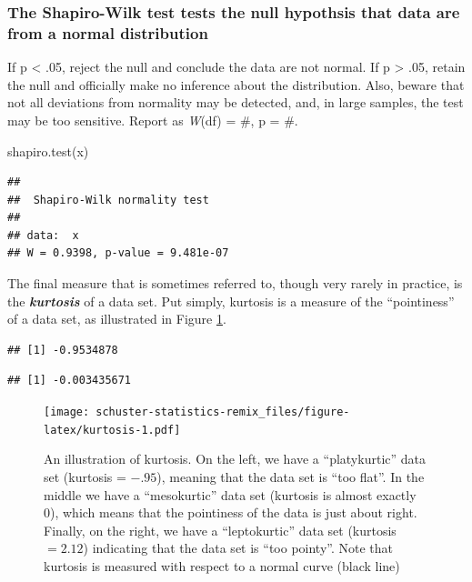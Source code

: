 \documentclass[
]{book}
\newenvironment{Shaded}{\begin{snugshade}}{\end{snugshade}}
\newcommand{\FunctionTok}[1]{\textcolor[rgb]{0.00,0.00,0.00}{#1}}
\newcommand{\NormalTok}[1]{#1}
\begin{document}
\hypertarget{the-shapiro-wilk-test-tests-the-null-hypothsis-that-data-are-from-a-normal-distribution}{%
\subsubsection{The Shapiro-Wilk test tests the null hypothsis that data are from a normal distribution}\label{the-shapiro-wilk-test-tests-the-null-hypothsis-that-data-are-from-a-normal-distribution}}

If p \textless{} .05, reject the null and conclude the data are not normal. If p \textgreater{} .05, retain the null and officially make no inference about the distribution. Also, beware that not all deviations from normality may be detected, and, in large samples, the test may be too sensitive. Report as \emph{W}(df) = \#, p = \#.

\begin{Shaded}
\begin{Highlighting}[]
\FunctionTok{shapiro.test}\NormalTok{(x) }
\end{Highlighting}
\end{Shaded}

\begin{verbatim}
## 
##  Shapiro-Wilk normality test
## 
## data:  x
## W = 0.9398, p-value = 9.481e-07
\end{verbatim}

The final measure that is sometimes referred to, though very rarely in practice, is the \textbf{\emph{kurtosis}} of a data set. Put simply, kurtosis is a measure of the ``pointiness'' of a data set, as illustrated in Figure \ref{fig:kurtosis}.

\begin{verbatim}
## [1] -0.9534878
\end{verbatim}

\begin{verbatim}
## [1] -0.003435671
\end{verbatim}

\begin{figure}
\centering
\texttt{[image: schuster-statistics-remix\_files/figure-latex/kurtosis-1.pdf]}
\caption{\label{fig:kurtosis}An illustration of kurtosis. On the left, we have a ``platykurtic'' data set (kurtosis = \(-.95\)), meaning that the data set is ``too flat''. In the middle we have a ``mesokurtic'' data set (kurtosis is almost exactly 0), which means that the pointiness of the data is just about right. Finally, on the right, we have a ``leptokurtic'' data set (kurtosis \(= 2.12\)) indicating that the data set is ``too pointy''. Note that kurtosis is measured with respect to a normal curve (black line)}
\end{figure}
\end{document}
